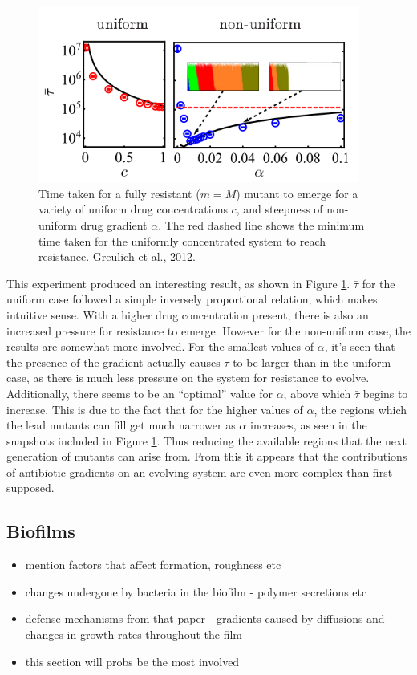 \documentclass[a4paper,12pt]{article}
\begin{document}
\begin{figure}[H]
 \centering
 \includegraphics[height=5.8cm]{greulich-time-til-resistance}
 \caption{Time taken for a fully resistant ($m = M$) mutant to emerge for a variety of uniform drug concentrations $c$, and steepness of non-uniform drug gradient $\alpha$.  
 The red dashed line shows the minimum time taken for the uniformly concentrated system to reach resistance.  Greulich et al., 2012.}
 \label{fig:Greulich-time-til-resistance}
\end{figure}


This experiment produced an interesting result, as shown in Figure \ref{fig:Greulich-time-til-resistance}.  $\bar{\tau}$ for the uniform case followed a simple inversely 
proportional relation, which makes intuitive sense.  With a higher drug concentration present, there is also an increased pressure for resistance to emerge.  However 
for the non-uniform case, the results are somewhat more involved.  For the smallest values of $\alpha$, it's seen that the presence of the gradient actually causes $\bar{\tau}$ 
to be larger than in the uniform case, as there is much less pressure on the system for resistance to evolve.  Additionally, there seems to be an ``optimal'' value for $\alpha$, 
above which $\bar{\tau}$ begins to increase.  This is due to the fact that for the higher values of $\alpha$, the regions which the lead mutants can fill get much narrower as 
$\alpha$ increases, as seen in the snapshots included in Figure \ref{fig:Greulich-time-til-resistance}.  Thus reducing the available regions that the next generation of mutants 
can arise from.  From this it appears that the contributions of antibiotic gradients on an evolving system are even more complex than first supposed.



\subsection{Biofilms}
\begin{itemize}
 \item mention factors that affect formation, roughness etc
 \item changes undergone by bacteria in the biofilm - polymer secretions etc
 \item defense mechanisms from that paper - gradients caused by diffusions and changes in growth rates throughout the film
 \item this section will probs be the most involved
\end{itemize}
\end{document}
